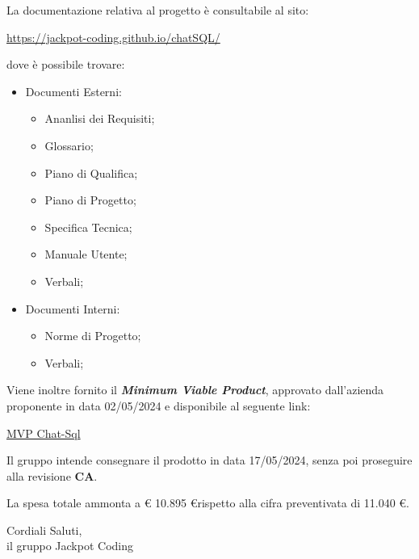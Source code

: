\documentclass[5pt]{article}
\begin{document}
\begin{flushleft}
La documentazione relativa al progetto è consultabile al sito:
\begin{center}
	\href{https://jackpot-coding.github.io/chatSQL/}{https://jackpot-coding.github.io/chatSQL/}
\end{center}
dove è possibile trovare:
\begin{itemize}
	\item Documenti Esterni:
	\begin{itemize}
		\item Ananlisi dei Requisiti;
		\item Glossario;
		\item Piano di Qualifica;
		\item Piano di Progetto;
		\item Specifica Tecnica;
		\item Manuale Utente;
		\item Verbali;
	\end{itemize}
	\item Documenti Interni:
	\begin{itemize}
		\item Norme di Progetto;
		\item Verbali;
	\end{itemize}
\end{itemize}
\end{flushleft}

\begin{flushleft}
Viene inoltre fornito il \textbf{\textit{Minimum Viable Product}}, approvato dall'azienda proponente in data 02/05/2024 e disponibile al seguente link:
\begin{center}
	\href{https://github.com/Jackpot-Coding/chatSQL/tree/main/src/chatSQL}{MVP Chat-Sql}
\end{center}
\end{flushleft}

\begin{flushleft}
Il gruppo intende consegnare il prodotto in data 17/05/2024, senza poi proseguire alla revisione \textbf{CA}.

La spesa totale ammonta a € 10.895 \euro \space rispetto alla cifra preventivata di 11.040 \euro.
\end{flushleft}

\vspace{8mm}

\begin{flushright}
	Cordiali Saluti,\\
	il gruppo Jackpot Coding
\end{flushright}
	
\end{document}
